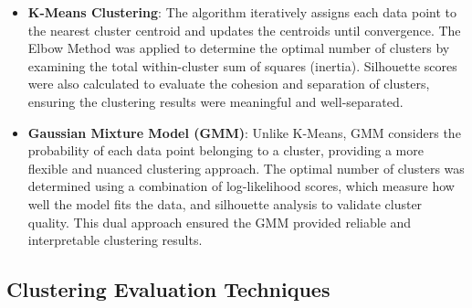         
        \begin{itemize}
        
            \item \textbf{K-Means Clustering}: The algorithm iteratively assigns each data point to the nearest cluster centroid and updates the centroids until convergence. The Elbow Method was applied to determine the optimal number of clusters by examining the total within-cluster sum of squares (inertia). Silhouette scores were also calculated to evaluate the cohesion and separation of clusters, ensuring the clustering results were meaningful and well-separated.
            
            \item \textbf{Gaussian Mixture Model (GMM)}: Unlike K-Means, GMM considers the probability of each data point belonging to a cluster, providing a more flexible and nuanced clustering approach. The optimal number of clusters was determined using a combination of log-likelihood scores, which measure how well the model fits the data, and silhouette analysis to validate cluster quality. This dual approach ensured the GMM provided reliable and interpretable clustering results.
            
        \end{itemize}
        
    \subsection{Clustering Evaluation Techniques}
    
